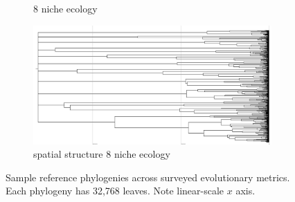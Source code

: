 \begin{figure}
\begin{subfigure}[b]{0.5\columnwidth}
    \caption{%
      8 niche ecology}
  \end{subfigure}
  \hfill
  \begin{subfigure}[b]{0.5\columnwidth}
    \includegraphics[height=0.12\textheight,width=\textwidth]{img/perfect-tree-phylogenies-log/epoch=7+resolution=3+treatment=18/a=collapsed-phylogeny+epoch=00007+mut_distn=np.random.standard_normal+num_generations=32768+num_islands=1024+num_niches=8+p_island_migration=0.01+p_niche_invasion=3.0517578125e-08+population_size=3276.../8+replicate=0+tournament_size=2+treatment=18+_generation=262144+_index=18+scale=nonlog+ext=.pdf}
    \caption{%
      spatial structure 8 niche ecology}
  \end{subfigure}
  \hfill
  \caption{%
    Sample reference phylogenies across surveyed evolutionary metrics.
    Each phylogeny has 32,768 leaves.
    Note linear-scale $x$ axis.
  }
  \label{fig:perfect-tree-phylogenies-nonlog}
\end{figure}


